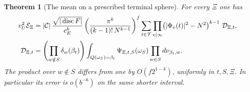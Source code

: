\documentclass[a4paper,11pt]{article}
\newtheorem{theorem}[proposition]{Theorem}
\theoremstyle{definition}
\theoremstyle{remark}
\numberwithin{equation}{section}
\begin{document}
\begin{theorem}[The mean on a prescribed terminal sphere]\leavevmode
\label{thm:spheremean872}
For every \(\Xi\) one has
\begin{align}
 v_U^2\mathcal E_\Xi
 &= |\mathcal C|\,
       \frac{\sqrt{|\operatorname{disc}F|}}{c_E^k}
       \left(\frac{\pi^k}{(k-1)!\,N^{k-1}}\right)^f
       \sum_{t\in\mathcal T}
          \prod_{v\mid\infty}\bigl(|\Phi_v(t)|^2-N^2\bigr)^{k-1}
          \ \mathcal D_{\Xi,t}, \label{eq:spheremean872}\\
 \mathcal D_{\Xi,t}
 &=\left(\prod_{w\notin S}\delta_w(\beta_t)\right)
       \int_{Q(\omega_S)=\beta_t}\Psi_{\Xi,t,S}(\omega_S)
                                \prod_{w\in S}d\nu_{\beta_t,w}.
 \notag
\end{align}
The product over \(w\notin S\) differs from one by
\(O(f2^{1-k})\), uniformly in \(t,S,\Xi\). In particular its
error is \(o(b^{-6})\) on the same shorter interval.
\end{theorem}
\end{document}
